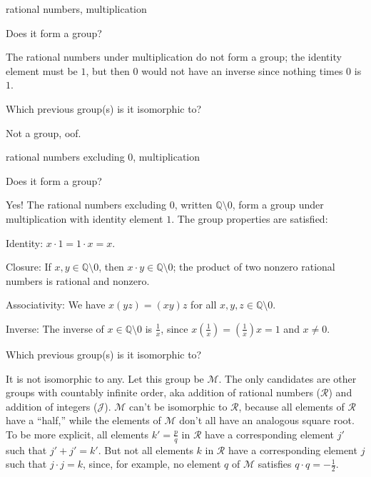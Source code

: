 \documentclass[../key.tex]{subfiles}
\begin{document}
\begin{inner_problem}
\item rational numbers, multiplication
\end{inner_problem}

\begin{iinner_problem}[start=1]
\item Does it form a group?
\end{iinner_problem}

\noindent The rational numbers under multiplication do not form a group; the identity element must be $1$, but then $0$ would not have an inverse since nothing times $0$ is $1$.

\begin{iinner_problem}
\item Which previous group(s) is it isomorphic to?
\end{iinner_problem}

\noindent Not a group, oof.

\begin{inner_problem}
\item rational numbers excluding $0$, multiplication
\end{inner_problem}

\begin{iinner_problem}[start=1]
\item Does it form a group?
\end{iinner_problem}

\noindent Yes! The rational numbers excluding $0$, written $\mathbb{Q} \setminus {0}$, form a group under multiplication with identity element $1$. The group properties are satisfied:

Identity: $x\cdot 1=1\cdot x=x$.

Closure: If $x,y\in \mathbb{Q} \setminus {0}$, then $x\cdot y\in \mathbb{Q} \setminus {0}$; the product of two nonzero rational numbers is rational and nonzero.

Associativity: We have $x(yz)=(xy)z$ for all $x,y,z \in \mathbb{Q} \setminus {0}$.

Inverse: The inverse of $x\in \mathbb{Q} \setminus {0}$ is $\frac{1}{x}$, since $x\left(\frac{1}{x}\right)=\left(\frac{1}{x}\right)x=1$ and $x\neq 0$.

\begin{iinner_problem}
\item Which previous group(s) is it isomorphic to?
\end{iinner_problem}

\noindent It is not isomorphic to any. Let this group be $\mathcal{M}$. The only candidates are other groups with countably infinite order, aka addition of rational numbers ($\mathcal{R}$) and addition of integers ($\mathcal{J}$). $\mathcal{M}$ can't be isomorphic to $\mathcal{R}$, because all elements of $\mathcal{R}$ have a ``half,'' while the elements of $\mathcal{M}$ don't all have an analogous square root. To be more explicit, all elements $k'=\frac{p}{q}$ in $\mathcal{R}$ have a
corresponding element $j'$ such that $j'+j'=k'$. But not all elements $k$ in $\mathcal{R}$ have a corresponding element $j$ such that $j\cdot j=k$, since, for example, no element $q$ of $\mathcal{M}$ satisfies $q\cdot q = -\frac{1}{2}$.
\end{document}
